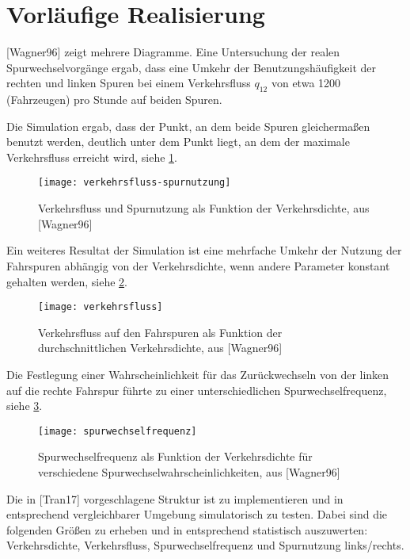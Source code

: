 \section{Vorläufige Realisierung}
\label{sec:realisierung}

[Wagner96] zeigt mehrere Diagramme. Eine Untersuchung der realen Spurwechselvorgänge ergab, dass eine Umkehr der Benutzungshäufigkeit der rechten und linken Spuren bei einem Verkehrsfluss $q_{12}$ von etwa 1200 (Fahrzeugen) pro Stunde auf beiden Spuren.

Die Simulation ergab, dass der Punkt, an dem beide Spuren gleichermaßen benutzt werden, deutlich unter dem Punkt liegt, an dem der maximale Verkehrsfluss erreicht wird, siehe \cref{figure:verkehrsfluss-spurnutzung}.

\begin{figure}[h]
 \centering
 \texttt{[image: verkehrsfluss-spurnutzung]}
 \caption[Verkehrsfluss und Spurnutzung als Funktion der Verkehrsdichte]{Verkehrsfluss und Spurnutzung als Funktion der Verkehrsdichte, aus [Wagner96]}
 \label{figure:verkehrsfluss-spurnutzung}
\end{figure}

Ein weiteres Resultat der Simulation ist eine mehrfache Umkehr der Nutzung der Fahrspuren abhängig von der Verkehrsdichte, wenn andere Parameter konstant gehalten werden, siehe \cref{figure:verkehrsfluss}.

\begin{figure}[h]
 \centering
 \texttt{[image: verkehrsfluss]}
 \caption[Verkehrsfluss als Funktion der durchschnittlichen Verkehrsdichte]{Verkehrsfluss auf den Fahrspuren als Funktion der durchschnittlichen Verkehrsdichte, aus [Wagner96]}
 \label{figure:verkehrsfluss}
\end{figure}

Die Festlegung einer Wahrscheinlichkeit für das Zurückwechseln von der linken auf die rechte Fahrspur führte zu einer unterschiedlichen Spurwechselfrequenz, siehe \cref{figure:spurwechselfrequenz}.

\begin{figure}[h]
 \centering
 \texttt{[image: spurwechselfrequenz]}
 \caption[Spurwechselfrequenz als Funktion der Verkehrsdichte]{Spurwechselfrequenz als Funktion der Verkehrsdichte für verschiedene Spurwechselwahrscheinlichkeiten, aus [Wagner96]}
 \label{figure:spurwechselfrequenz}
\end{figure}

Die in [Tran17] vorgeschlagene Struktur ist zu implementieren und in entsprechend vergleichbarer Umgebung simulatorisch zu testen. Dabei sind die folgenden Größen zu erheben und in entsprechend statistisch auszuwerten: Verkehrsdichte, Verkehrsfluss, Spurwechselfrequenz und Spurnutzung links/rechts.